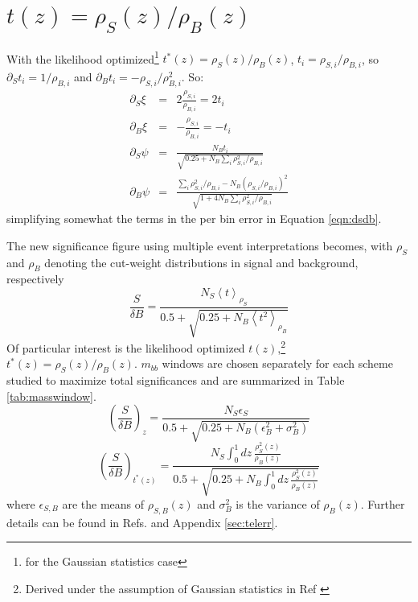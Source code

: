\section{$t\left(z\right)=\rho_{S}\left(z\right)/\rho_{B}\left(z\right)$}
With the likelihood optimized\footnote{for the Gaussian statistics case} $t^*\left(z\right)=\rho_S\left(z\right)/\rho_B\left(z\right)$, $t_i=\rho_{S,i}/\rho_{B,i}$, so $\partial_St_i=1/\rho_{B,i}$ and $\partial_B t_i=-\rho_{S,i}/\rho_{B,i}^2$. So:
\begin{eqnarray*}
  \partial_S\xi&=&2\frac{\rho_{S,i}}{\rho_{B,i}}=2t_i\\
  \partial_B\xi&=&-\frac{\rho_{S,i}}{\rho_{B,i}}=-t_i\\
  \partial_S\psi&=&\frac{N_Bt_i}{\sqrt{0.25+N_B\sum_i\rho_{S,i}^2/\rho_{B,i}}}\\
  \partial_B\psi&=&\frac{\sum_i\rho_{S,i}^2/\rho_{B,i}-N_B\left(\rho_{S,i}/\rho_{B,i}\right)^2}{\sqrt{1+4N_B\sum_i\rho_{S,i}^2/\rho_{B,i}}}
\end{eqnarray*}
simplifying somewhat the terms in the per bin error in Equation \ref{eqn:dsdb}.

  The new significance figure using multiple event interpretations becomes, with $\rho_S$ and $\rho_B$ denoting the cut-weight distributions in signal and background, respectively
\begin{equation}
\frac{S}{\delta B}=\frac{N_S\left<t\right>_{\rho_S}}{0.5+\sqrt{0.25+N_B\left<t^2\right>_{\rho_B}}}
\label{eqn:timp}
\end{equation}
Of particular interest is the likelihood optimized $t\left(z\right)$,\footnote{Derived under the assumption of Gaussian statistics in Ref \cite{multint}} $t^*\left(z\right)=\rho_S\left(z\right)/\rho_B\left(z\right)$.  $m_{bb}$ windows are chosen separately for each scheme studied to maximize total significances and are summarized in Table \ref{tab:masswindow}. 
\begin{equation}
\left(\frac{S}{\delta B}\right)_z=\frac{N_S\epsilon_S}{0.5+\sqrt{0.25+N_B\left(\epsilon_B^2+\sigma_B^2\right)}}
\label{eqn:timpz}
\end{equation}
\begin{equation}
\left(\frac{S}{\delta B}\right)_{t^*\left(z\right)}=\frac{N_S\int_0^1 dz\,\frac{\rho_S^2\left(z\right)}{\rho_B\left(z\right)}}{0.5+\sqrt{0.25+N_B\int_0^1dz\,\frac{\rho_S^2\left(z\right)}{\rho_B\left(z\right)}}}
\label{eqn:timptstar}
\end{equation}
where $\epsilon_{S,B}$ are the means of $\rho_{S,B}\left(z\right)$ and $\sigma_B^2$ is the variance of $\rho_B\left(z\right)$.  Further details can be found in Refs. \cite{teljet,multint} and Appendix \ref{sec:telerr}.

